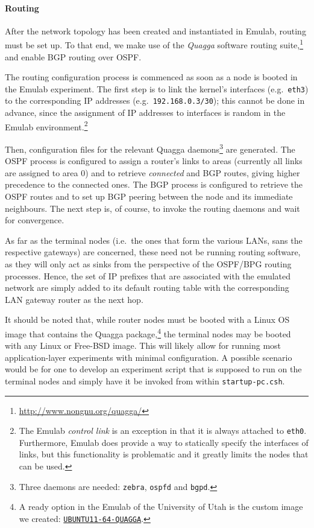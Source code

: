 \paragraph{Routing}

After the network topology has been created and instantiated in Emulab,
routing must be set up. To that end, we make use of the \emph{Quagga}
software routing suite,\footnote{\url{http://www.nongnu.org/quagga/}} and
enable BGP routing over OSPF.

The routing configuration process is commenced as soon as a node is booted
in the Emulab experiment. The first step is to link the kernel's interfaces
(e.g.\ \texttt{eth3}) to the corresponding IP addresses (e.g.\
\texttt{192.168.0.3/30}); this cannot be done in advance, since the
assignment of IP addresses to interfaces is random in the Emulab
environment.\footnote{The Emulab \emph{control link} is an exception in
  that it is always attached to \texttt{eth0}. Furthermore, Emulab does
  provide a way to statically specify the interfaces of links, but this
  functionality is problematic and it greatly limits the nodes that can be
  used.}

Then, configuration files for the relevant Quagga daemons\footnote{Three
  daemons are needed: \texttt{zebra}, \texttt{ospfd} and \texttt{bgpd}.}
are generated. The OSPF process is configured to assign a router's links to
areas (currently all links are assigned to area $0$) and to retrieve
\emph{connected} and BGP routes, giving higher precedence to the connected
ones. The BGP process is configured to retrieve the OSPF routes and to set
up BGP peering between the node and its immediate neighbours. The next step
is, of course, to invoke the routing daemons and wait for convergence.

As far as the terminal nodes (i.e.\ the ones that form the various LANs,
sans the respective gateways) are concerned, these need not be running
routing software, as they will only act as sinks from the perspective of
the OSPF/BPG routing processes. Hence, the set of IP prefixes that are
associated with the emulated network are simply added to its default
routing table with the corresponding LAN gateway router as the next hop.

It should be noted that, while router nodes must be booted with a Linux OS
image that contains the Quagga package,\footnote{A ready option in the
  Emulab of the University of Utah is the custom image we created:
  \href{https://www.emulab.net/showosinfo.php3?osid=3042}{\texttt{UBUNTU11-64-QUAGGA}}.}
the terminal nodes may be booted with any Linux or Free-BSD image. This
will likely allow for running most application-layer experiments with
minimal configuration. A possible scenario would be for one to develop an
experiment script that is supposed to run on the terminal nodes and simply
have it be invoked from within \texttt{startup-pc.csh}.

